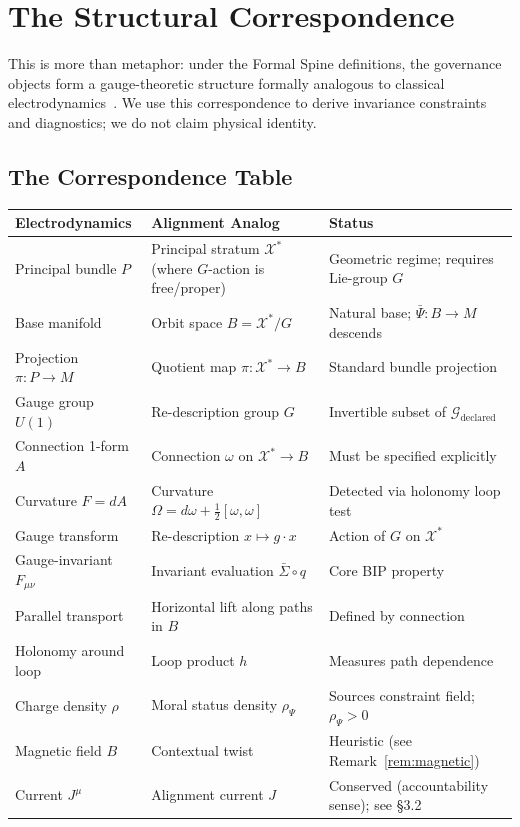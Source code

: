 \documentclass[12pt]{article}
\begin{document}
\section{The Structural Correspondence}

This is more than metaphor: under the Formal Spine definitions, the governance objects form
a gauge-theoretic structure formally analogous to classical electrodynamics~\cite{jackson1999,landau1975}. We use this
correspondence to derive invariance constraints and diagnostics; we do not claim physical identity.

\subsection{The Correspondence Table}

\begin{table}[h]
\centering
\begin{tabular}{lll}
\toprule
\textbf{Electrodynamics} & \textbf{Alignment Analog} & \textbf{Status} \\
\midrule
Principal bundle $P$ & Principal stratum $\mathcal{X}^*$ (where $G$-action is free/proper) & Geometric regime; requires Lie-group $G$ \\
Base manifold & Orbit space $B = \mathcal{X}^*/G$ & Natural base; $\bar{\Psi} : B \to M$ descends \\
Projection $\pi : P \to M$ & Quotient map $\pi : \mathcal{X}^* \to B$ & Standard bundle projection \\
Gauge group $U(1)$ & Re-description group $G$ & Invertible subset of $\mathcal{G}_{\text{declared}}$ \\
Connection 1-form $A$ & Connection $\omega$ on $\mathcal{X}^* \to B$ & Must be specified explicitly \\
Curvature $F = dA$ & Curvature $\Omega = d\omega + \frac{1}{2}[\omega, \omega]$ & Detected via holonomy loop test \\
Gauge transform & Re-description $x \mapsto g \cdot x$ & Action of $G$ on $\mathcal{X}^*$ \\
Gauge-invariant $F_{\mu\nu}$ & Invariant evaluation $\bar{\Sigma} \circ q$ & Core BIP property \\
Parallel transport & Horizontal lift along paths in $B$ & Defined by connection \\
Holonomy around loop & Loop product $h$ & Measures path dependence \\
Charge density $\rho$ & Moral status density $\rho_\Psi$ & Sources constraint field; $\rho_\Psi > 0$ \\
Magnetic field $B$ & Contextual twist & Heuristic (see Remark~\ref{rem:magnetic}) \\
Current $J^\mu$ & Alignment current $J$ & Conserved (accountability sense); see \S3.2 \\
\bottomrule
\end{tabular}
\end{table}
\end{document}
